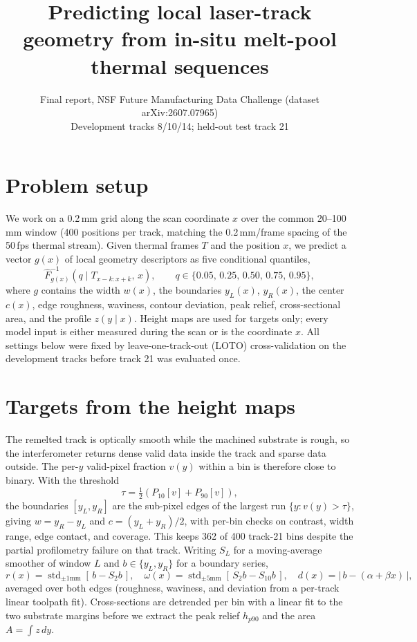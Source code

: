\documentclass[10pt]{article}
\title{\vspace{-1.4em}\large\textbf{Predicting local laser-track geometry from in-situ
melt-pool thermal sequences}\vspace{-0.4em}}
\author{\normalsize Final report, NSF Future Manufacturing Data Challenge
(dataset arXiv:2607.07965)\\
\normalsize Development tracks 8/10/14; held-out test track 21}
\date{}
\begin{document}
\maketitle\thispagestyle{empty}
\vspace{-2.2em}

\section{Problem setup}
We work on a 0.2\,mm grid along the scan coordinate $x$ over the common
20--100\,mm window (400 positions per track, matching the 0.2\,mm/frame
spacing of the 50\,fps thermal stream). Given thermal frames $T$ and the
position $x$, we predict a vector $g(x)$ of local geometry descriptors as
five conditional quantiles,
\begin{equation}
\hat{F}^{-1}_{g(x)}(q \mid T_{x-k:x+k},\, x), \qquad
q \in \{0.05,\, 0.25,\, 0.50,\, 0.75,\, 0.95\},
\end{equation}
where $g$ contains the width $w(x)$, the boundaries $y_L(x)$, $y_R(x)$, the
center $c(x)$, edge roughness, waviness, contour deviation, peak relief,
cross-sectional area, and the profile $z(y \mid x)$. Height maps are used
for targets only; every model input is either measured during the scan or
is the coordinate $x$. All settings below were fixed by leave-one-track-out
(LOTO) cross-validation on the development tracks before track 21 was
evaluated once.

\section{Targets from the height maps}
The remelted track is optically smooth while the machined substrate is
rough, so the interferometer returns dense valid data inside the track and
sparse data outside. The per-$y$ valid-pixel fraction $v(y)$ within a bin
is therefore close to binary. With the threshold
\begin{equation}
\tau = \tfrac{1}{2}\left(P_{10}[v] + P_{90}[v]\right),
\end{equation}
the boundaries $[y_L, y_R]$ are the sub-pixel edges of the largest run
$\{y : v(y) > \tau\}$, giving $w = y_R - y_L$ and $c = (y_L + y_R)/2$, with
per-bin checks on contrast, width range, edge contact, and coverage. This
keeps 362 of 400 track-21 bins despite the partial profilometry failure on
that track. Writing $S_L$ for a moving-average smoother of window $L$ and
$b \in \{y_L, y_R\}$ for a boundary series,
\begin{equation}
r(x) = \operatorname{std}_{\pm 1\text{mm}}[\,b - S_{2}b\,], \quad
\omega(x) = \operatorname{std}_{\pm 5\text{mm}}[\,S_{2}b - S_{10}b\,], \quad
d(x) = \left|\, b - (\alpha + \beta x) \,\right|,
\end{equation}
averaged over both edges (roughness, waviness, and deviation from a
per-track linear toolpath fit). Cross-sections are detrended per bin with a
linear fit to the two substrate margins before we extract the peak relief
$h_{p90}$ and the area $A = \int z\, dy$.
\end{document}
